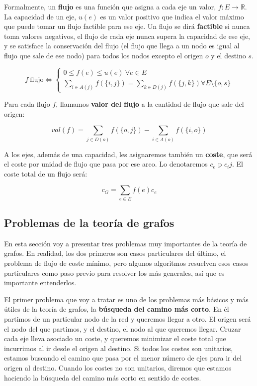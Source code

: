 Formalmente, un \textbf{flujo} es una función que asigna a cada eje un valor, $f:E\rightarrow \mathbb{R}$. La capacidad de un eje, $u(e)$ es un valor positivo que indica el valor máximo que puede tomar un flujo factible para ese eje. Un flujo se dirá \textbf{factible} si nunca toma valores negativos, el flujo de cada eje nunca supera la capacidad de ese eje, y se satisface la conservación del flujo (el flujo que llega a un nodo es igual al flujo que sale de ese nodo) para todos los nodos excepto el origen $o$ y el destino $s$.

\begin{equation}
f\ \text{flujo} \iff \left\{ \begin{array}{l}
    0\leq f(e) \leq u(e)\ \forall e \in E\\
    \sum\limits_{i \in A(j)} f(\{i,j\}) = \sum\limits_{k \in D(j)} f(\{j,k\}) \forall E \setminus \{o,s\}
\end{array} \right.
\end{equation}

Para cada flujo $f$, llamamos \textbf{valor del flujo} a la cantidad de flujo que sale del origen:

\begin{equation}
val(f)=\sum\limits_{j\in D(o)} f(\{o,j\}) - \sum\limits_{i\in A(o)} f(\{i,o\})
\end{equation}

A los ejes, además de una capacidad, les asignaremos también un \textbf{coste}, que será el coste por unidad de flujo que pasa por ese arco. Lo denotaremos $c_e$ p $c_ij$. El coste total de un flujo será:

\begin{equation}
c_G = \sum\limits_{e \in E} f(e) c_e
\end{equation}



\subsection{Problemas de la teoría de grafos}
En esta sección voy a presentar tres problemas muy importantes de la teoría de grafos.
En realidad, los dos primeros son casos particulares del último, el problema de flujo de coste mínimo, pero algunos algoritmos resuelven esos casos particulares como paso previo para resolver los más generales, así que es importante entenderlos.

El primer problema que voy a tratar es uno de los problemas más básicos y más útiles de la teoría de grafos, la \textbf{búsqueda del camino más corto}.
En él partimos de un particular nodo de la red y queremos llegar a otro. El origen será el nodo del que partimos, y el destino, el nodo al que queremos llegar.
Cruzar cada eje lleva asociado un coste, y queremos minimizar el coste total que incurrimos al ir desde el origen al destino.
Si todos los costes son unitarios, estamos buscando el camino que pasa por el menor número de ejes para ir del origen al destino.
Cuando los costes no son unitarios, diremos que estamos haciendo la búsqueda del camino más corto en sentido de costes.\\

